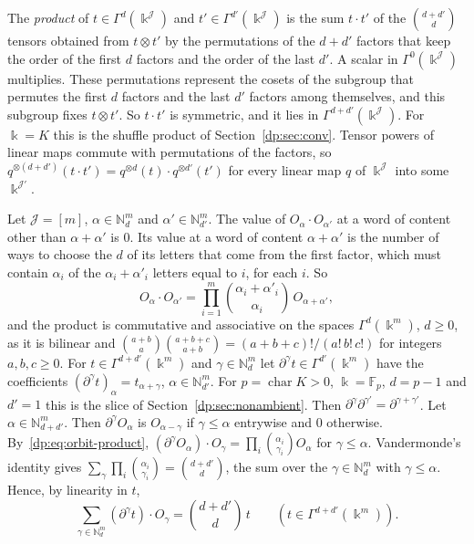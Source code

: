 \documentclass[11pt]{amsart}
\theoremstyle{definition}
\theoremstyle{remark}
\numberwithin{equation}{section}
\newcommand{\N}{\mathbb N}
\newcommand{\F}{\mathbb F}
\theoremstyle{plain}
\theoremstyle{definition}
\theoremstyle{plain}
\begin{document}
The \emph{product} of $t\in\Gamma^d(\Bbbk^{\mathcal J})$ and $t'\in\Gamma^{d'}(\Bbbk^{\mathcal J})$ is the sum $t\cdot t'$ of the $\binom{d+d'}d$ tensors obtained from $t\otimes t'$ by the permutations of the $d+d'$ factors that keep the order of the first $d$ factors and the order of the last $d'$. A scalar in $\Gamma^0(\Bbbk^{\mathcal J})$ multiplies. These permutations represent the cosets of the subgroup that permutes the first $d$ factors and the last $d'$ factors among themselves, and this subgroup fixes $t\otimes t'$. So $t\cdot t'$ is symmetric, and it lies in $\Gamma^{d+d'}(\Bbbk^{\mathcal J})$. For $\Bbbk=K$ this is the shuffle product of Section~\ref{dp:sec:conv}. Tensor powers of linear maps commute with permutations of the factors, so $q^{\otimes(d+d')}(t\cdot t')=q^{\otimes d}(t)\cdot q^{\otimes d'}(t')$ for every linear map $q$ of $\Bbbk^{\mathcal J}$ into some $\Bbbk^{\mathcal J'}$.

Let $\mathcal J=[m]$, $\alpha\in\N^m_d$ and $\alpha'\in\N^m_{d'}$. The value of $O_\alpha\cdot O_{\alpha'}$ at a word of content other than $\alpha+\alpha'$ is $0$. Its value at a word of content $\alpha+\alpha'$ is the number of ways to choose the $d$ of its letters that come from the first factor, which must contain $\alpha_i$ of the $\alpha_i+\alpha'_i$ letters equal to $i$, for each $i$. So
\begin{equation}\label{dp:eq:orbit-product}
 O_\alpha\cdot O_{\alpha'}=\prod_{i=1}^m\binom{\alpha_i+\alpha'_i}{\alpha_i}\,O_{\alpha+\alpha'},
\end{equation}
and the product is commutative and associative on the spaces $\Gamma^d(\Bbbk^m)$, $d\ge0$, as it is bilinear and $\binom{a+b}a\binom{a+b+c}{a+b}=(a+b+c)!/(a!\,b!\,c!)$ for integers $a,b,c\ge0$. For $t\in\Gamma^{d+d'}(\Bbbk^m)$ and $\gamma\in\N^m_d$ let $\partial^\gamma t\in\Gamma^{d'}(\Bbbk^m)$ have the coefficients $(\partial^\gamma t)_\alpha=t_{\alpha+\gamma}$, $\alpha\in\N^m_{d'}$. For $p=\operatorname{char}K>0$, $\Bbbk=\F_p$, $d=p-1$ and $d'=1$ this is the slice of Section~\ref{dp:sec:nonambient}. Then $\partial^\gamma\partial^{\gamma'}=\partial^{\gamma+\gamma'}$. Let $\alpha\in\N^m_{d+d'}$. Then $\partial^\gamma O_\alpha$ is $O_{\alpha-\gamma}$ if $\gamma\le\alpha$ entrywise and $0$ otherwise. By~\eqref{dp:eq:orbit-product}, $(\partial^\gamma O_\alpha)\cdot O_\gamma=\prod_i\binom{\alpha_i}{\gamma_i}O_\alpha$ for $\gamma\le\alpha$. Vandermonde's identity gives $\sum_\gamma\prod_i\binom{\alpha_i}{\gamma_i}=\binom{d+d'}d$, the sum over the $\gamma\in\N^m_d$ with $\gamma\le\alpha$. Hence, by linearity in $t$,
\begin{equation}\label{dp:eq:contraction-sum}
 \sum_{\gamma\in\N^m_d}(\partial^\gamma t)\cdot O_\gamma=\binom{d+d'}d\,t\qquad(t\in\Gamma^{d+d'}(\Bbbk^m)).
\end{equation}
\end{document}
